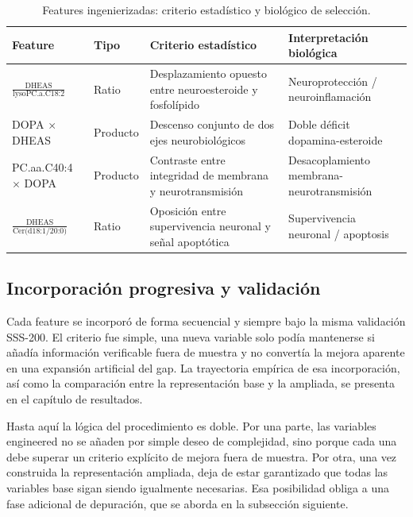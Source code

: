 \begin{table}[ht]
\centering
\caption{Features ingenierizadas: criterio estadístico y biológico de selección.}
\label{tab:features_eng}
\small
\begin{tabular}{ll>{\raggedright\arraybackslash}p{5cm}>{\raggedright\arraybackslash}p{4cm}}
\hline
\textbf{Feature} & \textbf{Tipo} & \textbf{Criterio estadístico} & \textbf{Interpretación biológica} \\
\hline
$\frac{\text{DHEAS}}{\text{lysoPC.a.C18:2}}$ & Ratio & Desplazamiento opuesto entre neuroesteroide y fosfolípido & Neuroprotección / neuroinflamación \\[6pt]
DOPA $\times$ DHEAS & Producto & Descenso conjunto de dos ejes neurobiológicos & Doble déficit dopamina-esteroide \\[6pt]
PC.aa.C40:4 $\times$ DOPA & Producto & Contraste entre integridad de membrana y neurotransmisión & Desacoplamiento membrana-neurotransmisión \\[6pt]
$\frac{\text{DHEAS}}{\text{Cer(d18:1/20:0)}}$ & Ratio & Oposición entre supervivencia neuronal y señal apoptótica & Supervivencia neuronal / apoptosis \\
\hline
\end{tabular}
\end{table}

\subsection{Incorporación progresiva y validación}

Cada feature se incorporó de forma secuencial y siempre bajo la misma validación SSS-200. El criterio fue simple, una
nueva variable solo podía mantenerse si añadía información verificable fuera de muestra y no convertía la mejora
aparente en una expansión artificial del gap. La trayectoria empírica de esa incorporación, así como la comparación entre
la representación base y la ampliada, se presenta en el capítulo de resultados.

Hasta aquí la lógica del procedimiento es doble. Por una parte, las variables engineered no se añaden por simple deseo
de complejidad, sino porque cada una debe superar un criterio explícito de mejora fuera de muestra. Por otra, una vez
construida la representación ampliada, deja de estar garantizado que todas las variables base sigan siendo igualmente
necesarias. Esa posibilidad obliga a una fase adicional de depuración, que se aborda en la subsección siguiente.


